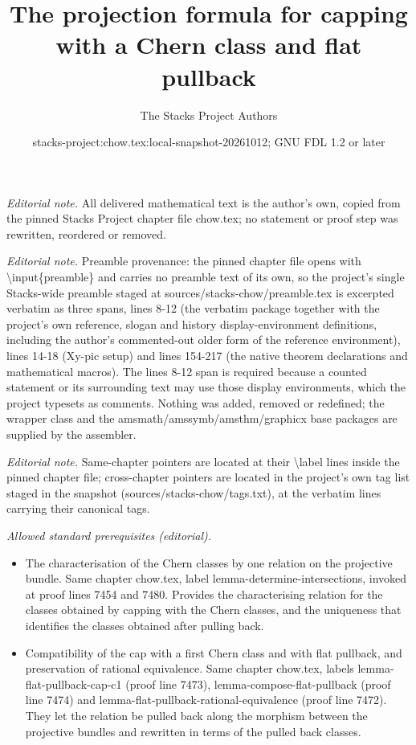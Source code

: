 \documentclass[10pt,a4paper]{amsart}
\title{The projection formula for capping with a Chern class and flat pullback}
\author{The Stacks Project Authors}
\date{stacks-project:chow.tex:local-snapshot-20261012; GNU FDL 1.2 or later}
\theoremstyle{plain}
\theoremstyle{definition}
\theoremstyle{remark}
\numberwithin{equation}{subsection}
\begin{document}
\maketitle
\noindent\textit{Editorial note.} All delivered mathematical text is the author's own, copied from the pinned Stacks Project chapter file chow.tex; no statement or proof step was rewritten, reordered or removed.\par\medskip
\noindent\textit{Editorial note.} Preamble provenance: the pinned chapter file opens with \textbackslash{}input\{preamble\} and carries no preamble text of its own, so the project's single Stacks-wide preamble staged at sources/stacks-chow/preamble.tex is excerpted verbatim as three spans, lines 8-12 (the verbatim package together with the project's own reference, slogan and history display-environment definitions, including the author's commented-out older form of the reference environment), lines 14-18 (Xy-pic setup) and lines 154-217 (the native theorem declarations and mathematical macros). The lines 8-12 span is required because a counted statement or its surrounding text may use those display environments, which the project typesets as comments. Nothing was added, removed or redefined; the wrapper class and the amsmath/amssymb/amsthm/graphicx base packages are supplied by the assembler.\par\medskip
\noindent\textit{Editorial note.} Same-chapter pointers are located at their \textbackslash{}label lines inside the pinned chapter file; cross-chapter pointers are located in the project's own tag list staged in the snapshot (sources/stacks-chow/tags.txt), at the verbatim lines carrying their canonical tags.\par\medskip
\noindent\textit{Allowed standard prerequisites (editorial).}\begin{itemize}
\item The characterisation of the Chern classes by one relation on the projective bundle. Same chapter chow.tex, label lemma-determine-intersections, invoked at proof lines 7454 and 7480. Provides the characterising relation for the classes obtained by capping with the Chern classes, and the uniqueness that identifies the classes obtained after pulling back.
\item Compatibility of the cap with a first Chern class and with flat pullback, and preservation of rational equivalence. Same chapter chow.tex, labels lemma-flat-pullback-cap-c1 (proof line 7473), lemma-compose-flat-pullback (proof line 7474) and lemma-flat-pullback-rational-equivalence (proof line 7472). They let the relation be pulled back along the morphism between the projective bundles and rewritten in terms of the pulled back classes.
\end{itemize}\medskip
\end{document}
